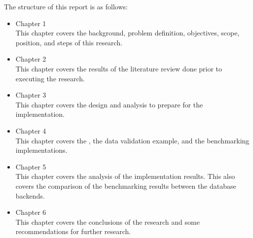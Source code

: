The structure of this report is as follows:

\begin{itemize}
    \item Chapter 1 \babSatu \\
        This chapter covers the background, problem definition, objectives,
        scope, position, and steps of this research.
    \item Chapter 2 \babDua \\
        This chapter covers the results of the literature review done prior to
        executing the research.
    \item Chapter 3 \babTiga \\
        This chapter covers the design and analysis to prepare for the
        implementation.
    \item Chapter 4 \babEmpat \\
        This chapter covers the , the data validation example,
        and the benchmarking implementations.
    \item Chapter 5 \babLima \\
        This chapter covers the analysis of the implementation results. This
        also covers the comparison of the benchmarking results between the
        database backends.
    \item Chapter 6 \kesimpulan \\
        This chapter covers the conclusions of the research and some
        recommendations for further research.
\end{itemize}
